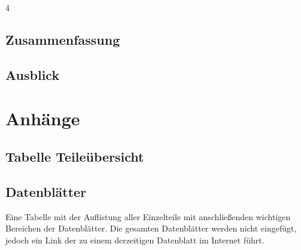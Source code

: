 \documentclass[11pt, titlepage, fleqn]{report}
\begin{document}
			4 
		\section{Zusammenfassung}
		\section{Ausblick}
	\chapter{Anhänge}
		\section{Tabelle Teileübersicht}
		\section{Datenblätter}
			Eine Tabelle mit der Auflistung aller Einzelteile mit anschließenden wichtigen Bereichen der Datenblätter.
			Die gesamten Datenblätter werden nicht eingefügt, jedoch ein Link der zu einem derzeitigen Datenblatt im Internet führt.
		\newpage
\end{document}
